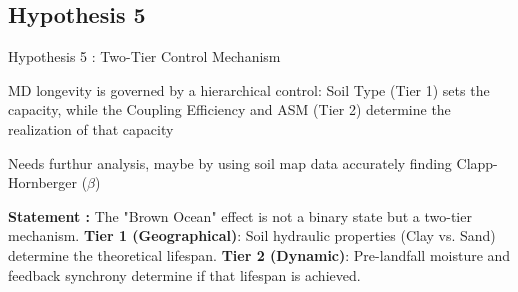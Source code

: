 \documentclass[8pt, aspectratio=169]{beamer}
\begin{document}
\subsection{Hypothesis 5}
\begin{frame}{Hypothesis 5 : Two-Tier Control Mechanism}
    \vspace{-0.1cm}
    \begin{block}{MD longevity is governed by a hierarchical control: Soil Type (Tier 1) sets the capacity, while the Coupling Efficiency and ASM (Tier 2) determine the realization of that capacity}\end{block}

    \vspace{-0.5cm}
    \begin{alertblock}{\tiny Needs furthur analysis, maybe by using soil map data accurately finding Clapp-Hornberger ($\beta$)}\end{alertblock}

    \vspace{-0.3cm}
    \footnotesize
    \textbf{Statement :} The "Brown Ocean" effect is not a binary state but a two-tier mechanism. \textbf{Tier 1 (Geographical)}: Soil hydraulic properties (Clay vs. Sand) determine the theoretical lifespan. \textbf{Tier 2 (Dynamic)}: Pre-landfall moisture and feedback synchrony determine if that lifespan is achieved.


\end{frame}
\end{document}
